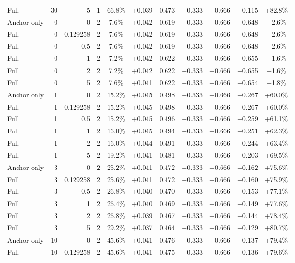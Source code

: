 \begin{table}[htbp]
\begin{tabular}{lrrrccccccc}
Full & 30 & 5 & 1 & 66.8\% & +0.039 & 0.473 & +0.333 & +0.666 & +0.115 & +82.8\% \\
Anchor only & 0 & 0 & 2 & 7.6\% & +0.042 & 0.619 & +0.333 & +0.666 & +0.648 & +2.6\% \\
Full & 0 & 0.129258 & 2 & 7.6\% & +0.042 & 0.619 & +0.333 & +0.666 & +0.648 & +2.6\% \\
Full & 0 & 0.5 & 2 & 7.6\% & +0.042 & 0.619 & +0.333 & +0.666 & +0.648 & +2.6\% \\
Full & 0 & 1 & 2 & 7.2\% & +0.042 & 0.622 & +0.333 & +0.666 & +0.655 & +1.6\% \\
Full & 0 & 2 & 2 & 7.2\% & +0.042 & 0.622 & +0.333 & +0.666 & +0.655 & +1.6\% \\
Full & 0 & 5 & 2 & 7.6\% & +0.041 & 0.622 & +0.333 & +0.666 & +0.654 & +1.8\% \\
Anchor only & 1 & 0 & 2 & 15.2\% & +0.045 & 0.498 & +0.333 & +0.666 & +0.267 & +60.0\% \\
Full & 1 & 0.129258 & 2 & 15.2\% & +0.045 & 0.498 & +0.333 & +0.666 & +0.267 & +60.0\% \\
Full & 1 & 0.5 & 2 & 15.2\% & +0.045 & 0.496 & +0.333 & +0.666 & +0.259 & +61.1\% \\
Full & 1 & 1 & 2 & 16.0\% & +0.045 & 0.494 & +0.333 & +0.666 & +0.251 & +62.3\% \\
Full & 1 & 2 & 2 & 16.0\% & +0.044 & 0.491 & +0.333 & +0.666 & +0.244 & +63.4\% \\
Full & 1 & 5 & 2 & 19.2\% & +0.041 & 0.481 & +0.333 & +0.666 & +0.203 & +69.5\% \\
Anchor only & 3 & 0 & 2 & 25.2\% & +0.041 & 0.472 & +0.333 & +0.666 & +0.162 & +75.6\% \\
Full & 3 & 0.129258 & 2 & 25.6\% & +0.041 & 0.472 & +0.333 & +0.666 & +0.160 & +75.9\% \\
Full & 3 & 0.5 & 2 & 26.8\% & +0.040 & 0.470 & +0.333 & +0.666 & +0.153 & +77.1\% \\
Full & 3 & 1 & 2 & 26.4\% & +0.040 & 0.469 & +0.333 & +0.666 & +0.149 & +77.6\% \\
Full & 3 & 2 & 2 & 26.8\% & +0.039 & 0.467 & +0.333 & +0.666 & +0.144 & +78.4\% \\
Full & 3 & 5 & 2 & 29.2\% & +0.037 & 0.464 & +0.333 & +0.666 & +0.129 & +80.7\% \\
Anchor only & 10 & 0 & 2 & 45.6\% & +0.041 & 0.476 & +0.333 & +0.666 & +0.137 & +79.4\% \\
Full & 10 & 0.129258 & 2 & 45.6\% & +0.041 & 0.475 & +0.333 & +0.666 & +0.136 & +79.6\% \\

\end{tabular}
\end{table}

